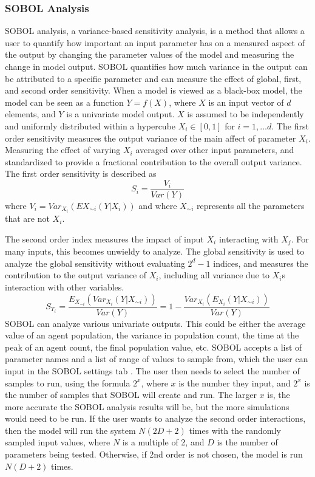 \subsubsection{SOBOL Analysis}
SOBOL analysis, a variance-based sensitivity analysis, is a method that allows a user to quantify how important an input parameter has on a measured aspect of the output by changing the parameter values of the model and measuring the change in model output. 
SOBOL quantifies how much variance in the output can be attributed to a specific parameter and can measure the effect of global, first, and second order sensitivity.  
When a model is viewed as a black-box model, the model can be seen as a function $Y=f(X)$, where $X$ is an input vector of $d$ elements, and $Y$ is a univariate model output. 
$X$ is assumed to be independently and uniformly distributed within a hypercube $X_i \in [0, 1]$ for $i=1, \dots d$. 
The first order sensitivity measures the output variance of the main affect of parameter $X_i$. 
Measuring the effect of varying $X_i$ averaged over other input parameters, and standardized to provide a fractional contribution to the overall output variance. 
The first order sensitivity is described as 
\[
    S_i = \frac{V_i}{Var(Y)}
\] where $V_i = Var_{X_i}(E{X_{\sim i}}(Y|X_i))$ and where $X_{\sim i}$ represents all the parameters that are not $X_i$. 
\newline

The second order index measures the impact of input $X_i$ interacting with $X_j$. For many inputs, this becomes unwieldy to analyze. 
The global sensitivity is used to analyze the global sensitivity without evaluating $2^d-1$ indices, and measures the contribution to the output variance of $X_i$, including all variance due to $X_i$s interaction with other variables. 
\[
    S_{T_i} = \frac{E_{X_{\sim i}}(Var_{X_i}(Y|X_{\sim i}))}{Var(Y)} = 1 - \frac{Var_{X_i}(E_{X_i}(Y|X_{\sim i}))}{Var(Y)}
\]
SOBOL can analyze various univariate outputs. 
This could be either the average value of an agent population, the variance in population count, the time at the peak of an agent count, the final population value, etc. \newline
SOBOL accepts a list of parameter names and a list of range of values to sample from, which the user can input in the SOBOL settings tab . 
The user then needs to select the number of samples to run, using the formula $2^x$, where $x$ is the number they input, and $2^x$ is the number of samples that SOBOL will create and run. 
The larger $x$ is, the more accurate the SOBOL analysis results will be, but the more simulations would need to be run. \newline 
If the user wants to analyze the second order interactions, then the model will run the system $N(2D+2)$ times with the randomly sampled input values, where $N$ is a multiple of 2, and $D$ is the number of parameters being tested. 
Otherwise, if 2nd order is not chosen, the model is run $N(D+2)$ times. 

